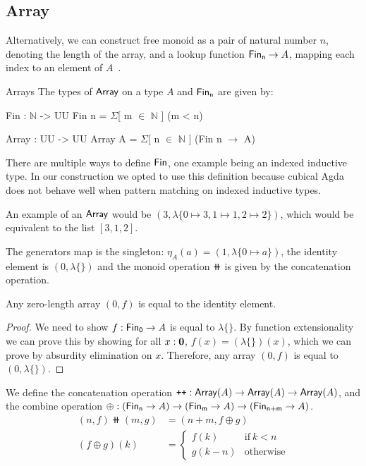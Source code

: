 \subsection{Array}

Alternatively, we can construct free monoid as a pair of natural number $n$, denoting the length of the array,
and a lookup function $\Fin[n] \to A$, mapping each index to an element of $A$~\cite{dubucFreeMonoids1974}.

\begin{definition}{Arrays}\label{mon:array}
The types of $\operatorname{\mathsf{Array}}$ on a type $A$ and $\Fin[n]$ are given by:
\begin{code}
Fin : $\mathbb{N}$ -> UU
Fin n = $\Sigma$[ m $\in$ $\mathbb{N}$ ] (m < n)

Array : UU -> UU
Array A = $\Sigma$[ n $\in$ $\mathbb{N}$ ] (Fin n $\to$ A)
\end{code}
\end{definition}

There are multiple ways to define $\Fin$, one example being an indexed inductive type.
In our construction we opted to use this definition because cubical Agda does not behave well
when pattern matching on indexed inductive types. 

An example of an $\operatorname{\mathsf{Array}}$ would be $(3, \lambda\{ 0 \mapsto 3, 1 \mapsto 1, 2 \mapsto 2 \})$, which would
be equivalent to the list $[3, 1, 2]$.

The generators map is the singleton: $\eta_A(a) = (1, \lambda\{ 0 \mapsto a \})$, 
the identity element is $(0, \lambda\{\})$
and the monoid operation $\doubleplus$ is given by the concatenation operation.

\begin{lemma}\label{array:zero-is-id}
Any zero-length array $(0, f)$ is equal to the identity element.
\end{lemma}

\begin{proof}
We need to show $f : \Fin[0] \to A$ is equal to $\lambda\{\}$. By function extensionality we can prove
this by showing for all $x : {\mathbf{0}}$, $f(x) = (\lambda\{\})(x)$, which we can prove by absurdity elimination on $x$.
Therefore, any array $(0, f)$ is equal to $(0, \lambda\{\})$.
\end{proof}

\begin{definition}[Concatenation]
We define the concatenation operation $\mathbin{\text{\ttfamily\upshape ++}} : \operatorname{\mathsf{Array}}(A) \to \operatorname{\mathsf{Array}}(A) \to \operatorname{\mathsf{Array}}(A)$,
and the combine operation $\oplus : (\Fin[n] \to A) \to (\Fin[m] \to A) \to (\Fin[n+m] \to\nolinebreak A)$.
\begin{align*}
    (n , f) \doubleplus (m , g) & = (n + m , f \oplus g) \\
    (f \oplus g)(k) & = \begin{cases}
      f(k) & \text{if}\ k < n \\
      g(k - n) & \text{otherwise}
    \end{cases}
\end{align*} 
\end{definition}

